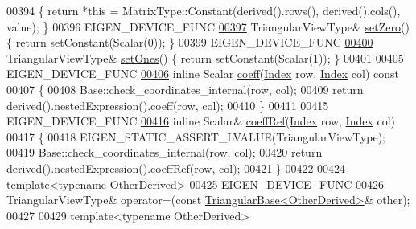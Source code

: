 \begin{DoxyCode}
00394     \{ \textcolor{keywordflow}{return} *\textcolor{keyword}{this} = MatrixType::Constant(derived().rows(), derived().cols(), value); \}
00396     EIGEN\_DEVICE\_FUNC
\hyperlink{group___core___module_a27ea7bd66892206be3a0c7a1195fec14}{00397}     TriangularViewType& \hyperlink{group___core___module_a27ea7bd66892206be3a0c7a1195fec14}{setZero}() \{ \textcolor{keywordflow}{return} setConstant(Scalar(0)); \}
00399     EIGEN\_DEVICE\_FUNC
\hyperlink{group___core___module_a39d202f5efbf14179ca30435c9dc04b5}{00400}     TriangularViewType& \hyperlink{group___core___module_a39d202f5efbf14179ca30435c9dc04b5}{setOnes}() \{ \textcolor{keywordflow}{return} setConstant(Scalar(1)); \}
00401 
00405     EIGEN\_DEVICE\_FUNC
\hyperlink{group___core___module_a906168fa5121cfe301bc801df50807ad}{00406}     \textcolor{keyword}{inline} Scalar \hyperlink{group___core___module_a906168fa5121cfe301bc801df50807ad}{coeff}(\hyperlink{group___core___module_a554f30542cc2316add4b1ea0a492ff02}{Index} row, \hyperlink{group___core___module_a554f30542cc2316add4b1ea0a492ff02}{Index} col)\textcolor{keyword}{ const}
00407 \textcolor{keyword}{    }\{
00408       Base::check\_coordinates\_internal(row, col);
00409       \textcolor{keywordflow}{return} derived().nestedExpression().coeff(row, col);
00410     \}
00411 
00415     EIGEN\_DEVICE\_FUNC
\hyperlink{group___core___module_a451953e43fc2e9231f05e7926d0e9d98}{00416}     \textcolor{keyword}{inline} Scalar& \hyperlink{group___core___module_a451953e43fc2e9231f05e7926d0e9d98}{coeffRef}(\hyperlink{group___core___module_a554f30542cc2316add4b1ea0a492ff02}{Index} row, \hyperlink{group___core___module_a554f30542cc2316add4b1ea0a492ff02}{Index} col)
00417     \{
00418       EIGEN\_STATIC\_ASSERT\_LVALUE(TriangularViewType);
00419       Base::check\_coordinates\_internal(row, col);
00420       \textcolor{keywordflow}{return} derived().nestedExpression().coeffRef(row, col);
00421     \}
00422 
00424     \textcolor{keyword}{template}<\textcolor{keyword}{typename} OtherDerived>
00425     EIGEN\_DEVICE\_FUNC
00426     TriangularViewType& operator=(\textcolor{keyword}{const} \hyperlink{group___core___module_class_eigen_1_1_triangular_base}{TriangularBase<OtherDerived>}& other);
00427 
00429     \textcolor{keyword}{template}<\textcolor{keyword}{typename} OtherDerived>

\end{DoxyCode}
